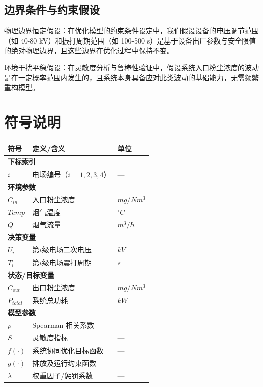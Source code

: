 \documentclass[UTF8, a4paper]{ctexart}
\begin{document}
\subsection{边界条件与约束假设}

物理边界恒定假设：在优化模型的约束条件设定中，我们假设设备的电压调节范围（如 40-80 kV）和振打周期范围（如 100-500 s）是基于设备出厂参数与安全限值的绝对物理边界，且这些边界在优化过程中保持不变。

环境干扰平稳假设：在灵敏度分析与鲁棒性验证中，假设系统入口粉尘浓度的波动是在一定概率范围内发生的，且系统本身具备应对此类波动的基础能力，无需频繁重构模型。
\section{符号说明}
\renewcommand{\arraystretch}{1.5} %
\begin{table}[H]
    \centering
    \label{tab:symbols}
    \begin{tabular*}{0.9\textwidth}{@{\extracolsep{\fill}}lll@{}}
        \toprule
        符号 & 定义/含义 & 单位 \\
        \midrule
        \multicolumn{3}{l}{\textbf{下标索引}} \\
        $i$ & 电场编号（$i=1,2,3,4$） & — \\
        \multicolumn{3}{l}{\textbf{环境参数}} \\
        $C_{in}$ & 入口粉尘浓度 & $mg/Nm^3$ \\
        $Temp$ & 烟气温度 & $^\circ C$ \\
        $Q$ & 烟气流量 & $m^3/h$ \\
        \multicolumn{3}{l}{\textbf{决策变量}} \\
        $U_i$ & 第$i$级电场二次电压 & $kV$ \\
        $T_i$ & 第$i$级电场震打周期 & $s$ \\
        \multicolumn{3}{l}{\textbf{状态/目标变量}} \\
        $C_{out}$ & 出口粉尘浓度 & $mg/Nm^3$ \\
        $P_{total}$ & 系统总功耗 & $kW$ \\
        \multicolumn{3}{l}{\textbf{模型参数}} \\
        $\rho$ & Spearman 相关系数 & — \\
        $S$ & 灵敏度指标 & — \\
        $f(\cdot)$ & 系统协同优化目标函数 & — \\
        $g(\cdot)$ & 排放及运行约束函数 & — \\
        $\lambda$ & 权重因子/惩罚系数 & — \\
        \bottomrule
    \end{tabular*}
\end{table}
\end{document}
